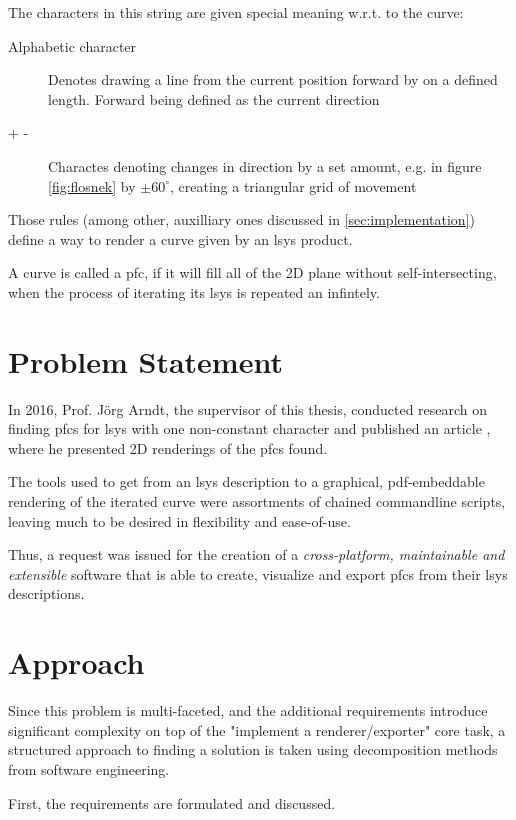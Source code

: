 The characters in this string are given special meaning w.r.t. to the curve:
\begin{description}
	\item[Alphabetic character] Denotes drawing a line from the current position forward by on a defined length. Forward being defined as the current direction
	\item[+ -] Charactes denoting changes in direction by a set amount, e.g. in figure \ref{fig:flosnek} by $\pm60^\circ$, creating a triangular grid of movement
\end{description}

Those rules (among other, auxilliary ones discussed in \ref{sec:implementation}) define a way to render a curve given by an \gls{lsys} \gls{product}.

A curve is called a \gls{pfc}, if it will fill all of the 2D plane without self-intersecting, when the process of iterating its \gls{lsys} is repeated an infintely.

\section{Problem Statement}
In 2016, Prof. Jörg Arndt, the supervisor of this thesis, conducted research on finding \gls{pfc}s for \gls{lsys} with one non-constant character and published an article \citep{Arndt2016}, where he presented 2D renderings of the \gls{pfc}s found.

The tools used to get from an \gls{lsys} description to a graphical, pdf-embeddable rendering of the iterated curve were assortments of chained commandline scripts, leaving much to be desired in flexibility and ease-of-use.

Thus, a request was issued for the creation of a \emph{cross-platform, maintainable and extensible} software that is able to create, visualize and export \gls{pfc}s from their \gls{lsys} descriptions.

\section{Approach}

Since this problem is multi-faceted, and the additional requirements introduce significant complexity on top of the "implement a renderer/exporter" core task, a structured approach to finding a solution is taken using decomposition methods from software engineering.

First, the requirements are formulated and discussed.

